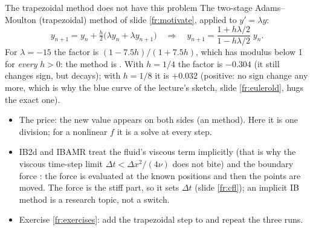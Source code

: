 \documentclass[aspectratio=169,11pt]{beamer}
\begin{document}
\begin{frame}{The trapezoidal method does not have this problem}
\label{fr:trap}
\small
The two-stage Adams--Moulton (trapezoidal) method of slide \ref{fr:motivate}, applied to $y' = \lambda y$:
\[ y_{n+1} = y_n + \tfrac{h}{2}\big(\lambda y_n + \lambda y_{n+1}\big) \quad\Longrightarrow\quad y_{n+1} = \frac{1 + h\lambda/2}{1 - h\lambda/2}\; y_n . \]
For $\lambda = -15$ the factor is $(1 - 7.5h)/(1 + 7.5h)$, which has modulus below 1 for \emph{every} $h > 0$: the method is . With $h = 1/4$ the factor is $-0.304$ (it still changes sign, but decays); with $h = 1/8$ it is $+0.032$ (positive: no sign change any more, which is why the blue curve of the lecture's sketch, slide \ref{fr:eulerold}, hugs the exact one).
\begin{itemize}
  \item The price: the new value appears on both sides (an  method). Here it is one division; for a nonlinear $f$ it is a solve at every step.
  \item IB2d and IBAMR treat the fluid's viscous term implicitly (that is why the viscous time-step limit $\Delta t < \Delta x^2/(4\nu)$ does not bite) and the boundary force : the force is evaluated at the known positions and then the points are moved. The force is the stiff part, so it sets $\Delta t$ (slide \ref{fr:cfl}); an implicit IB method is a research topic, not a switch.
  \item Exercise \ref{fr:exercises}: add the trapezoidal step to  and repeat the three runs.
\end{itemize}
\end{frame}
\end{document}
